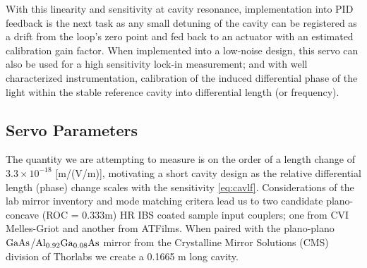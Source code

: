 With this linearity and sensitivity at cavity resonance, implementation into PID feedback is the next task as any small detuning of the cavity can be registered as a drift from the loop's zero point and fed back to an actuator with an estimated calibration gain factor. When implemented into a low-noise design, this servo can also be used for a high sensitivity lock-in measurement; and with well characterized instrumentation, calibration of the induced differential phase of the light within the stable reference cavity into differential length (or frequency).


\subsection{Servo Parameters}
The quantity we are attempting to measure is on the order of a length change of $3.3 \times 10^{-18}$ [m/(V/m)], motivating a short cavity design as the relative differential length (phase) change scales with the sensitivity \autoref{eq:cavlf}. Considerations of the lab mirror inventory and mode matching critera lead us to two candidate plano-concave (ROC = 0.333m) HR IBS coated sample input couplers; one from CVI Melles-Griot and another from ATFilms. When paired with the plano-plano $\mathrm{GaAs}$/$\mathrm{Al_{0.92}Ga_{0.08}As}$  mirror from the Crystalline Mirror Solutions (CMS) division of Thorlabs we create a 0.1665 m long cavity.


